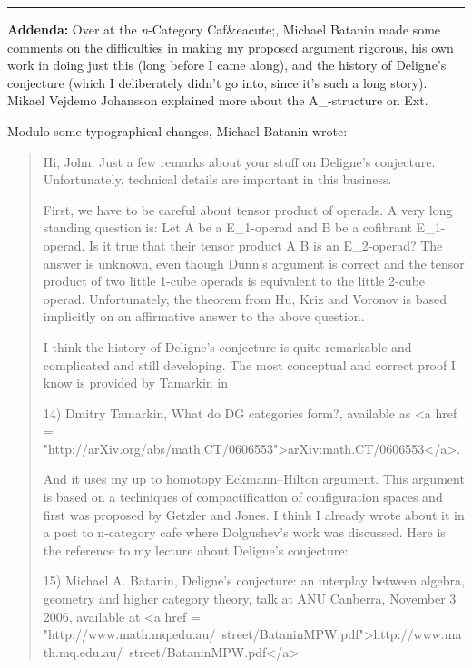 \par\noindent\rule{\textwidth}{0.4pt}

\textbf{Addenda:} 
Over at the \emph{n}-Category Caf&eacute;, 
Michael Batanin made some comments on the
difficulties in making my proposed argument rigorous, his own work in
doing just this (long before I came along), and the history of Deligne's
conjecture (which I deliberately didn't go into, since it's such a
long story).  Mikael Vejdemo Johansson explained more about the
A_{\infty }-structure on Ext.

Modulo some typographical changes, Michael Batanin wrote:

\begin{quote}

   Hi, John.
   Just a few remarks about your stuff on Deligne's conjecture. 
   Unfortunately, technical details are important in this business.

   First, we have to be careful about tensor product of operads. A
   very long standing question is: Let A be a E_{1}-operad and
   B be a cofibrant E_{1}-operad.  Is it true that their
   tensor product A \otimes  B is an E_{2}-operad?  The answer
   is unknown, even though Dunn's argument is correct and the tensor
   product of two little 1-cube operads is equivalent to the little
   2-cube operad.  Unfortunately, the theorem from Hu, Kriz and
   Voronov is based implicitly on an affirmative answer to the above
   question.

   I think the history of Deligne's conjecture is quite remarkable and 
   complicated and still developing. The most conceptual and correct 
   proof I know is provided by Tamarkin in 

   14) Dmitry Tamarkin, What do DG categories form?, available as <a
   href =
   "http://arXiv.org/abs/math.CT/0606553">arXiv:math.CT/0606553</a>.

   And it uses my up to homotopy Eckmann--Hilton argument. This argument 
   is based on a techniques of compactification of configuration spaces 
   and first was proposed by Getzler and Jones.  I think I already wrote 
   about it in a post to n-category cafe where Dolgushev's work was 
   discussed. Here is the reference to my lecture about Deligne's conjecture:

   15) Michael A. Batanin, Deligne's conjecture: an interplay between
   algebra, geometry and higher category theory, talk at ANU Canberra,
   November 3 2006, available at 
   <a href = "http://www.math.mq.edu.au/~street/BataninMPW.pdf">http://www.math.mq.edu.au/~street/BataninMPW.pdf</a>
 

\end{quote}
